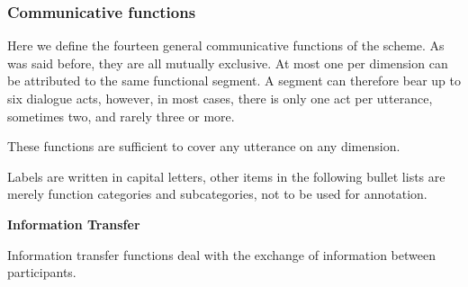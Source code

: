 \subsubsection{Communicative functions}

Here we define the fourteen general communicative functions of the scheme. As was said before, they are all mutually exclusive. At most one per dimension can be attributed to the same functional segment. A segment can therefore bear up to six dialogue acts, however, in most cases, there is only one act per utterance, sometimes two, and rarely three or more.

These functions are sufficient to cover any utterance on any dimension.

Labels are written in capital letters, other items in the following bullet lists are merely function categories and subcategories, not to be used for annotation. 

\vspace{0.25cm}

\textbf{Information Transfer}
\vspace{0.1cm}

Information transfer functions deal with the exchange of information between participants.

